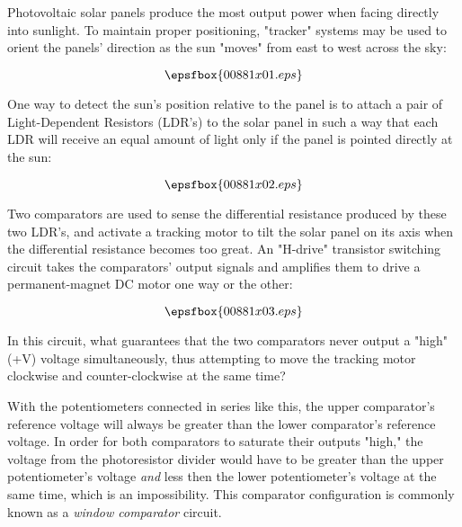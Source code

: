 

Photovoltaic solar panels produce the most output power when facing directly into sunlight.  To maintain proper positioning, "tracker" systems may be used to orient the panels' direction as the sun "moves" from east to west across the sky:

$$\epsfbox{00881x01.eps}$$

One way to detect the sun's position relative to the panel is to attach a pair of Light-Dependent Resistors (LDR's) to the solar panel in such a way that each LDR will receive an equal amount of light only if the panel is pointed directly at the sun:

$$\epsfbox{00881x02.eps}$$

Two comparators are used to sense the differential resistance produced by these two LDR's, and activate a tracking motor to tilt the solar panel on its axis when the differential resistance becomes too great.  An "H-drive" transistor switching circuit takes the comparators' output signals and amplifies them to drive a permanent-magnet DC motor one way or the other:

$$\epsfbox{00881x03.eps}$$

In this circuit, what guarantees that the two comparators never output a "high" (+V) voltage simultaneously, thus attempting to move the tracking motor clockwise and counter-clockwise at the same time?







With the potentiometers connected in series like this, the upper comparator's reference voltage will always be greater than the lower comparator's reference voltage.  In order for both comparators to saturate their outputs "high," the voltage from the photoresistor divider would have to be greater than the upper potentiometer's voltage {\it and} less then the lower potentiometer's voltage at the same time, which is an impossibility.  This comparator configuration is commonly known as a {\it window comparator} circuit.






